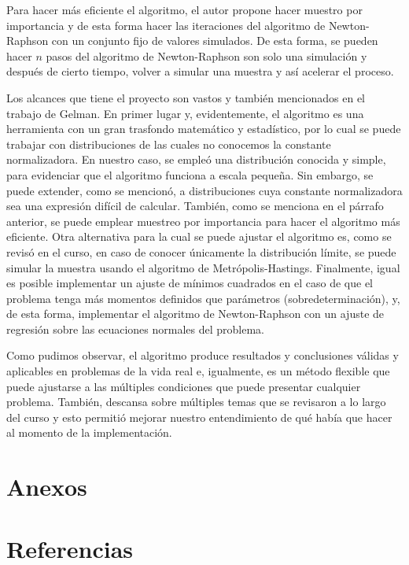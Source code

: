 \documentclass[9pt,twocolumn,twoside,]{pnas-new}
\begin{document}
Para hacer más eficiente el algoritmo, el autor propone hacer muestro
por importancia y de esta forma hacer las iteraciones del algoritmo de
Newton-Raphson con un conjunto fijo de valores simulados. De esta forma,
se pueden hacer \(n\) pasos del algoritmo de Newton-Raphson son solo una
simulación y después de cierto tiempo, volver a simular una muestra y
así acelerar el proceso.

Los alcances que tiene el proyecto son vastos y también mencionados en
el trabajo de Gelman. En primer lugar y, evidentemente, el algoritmo es
una herramienta con un gran trasfondo matemático y estadístico, por lo
cual se puede trabajar con distribuciones de las cuales no conocemos la
constante normalizadora. En nuestro caso, se empleó una distribución
conocida y simple, para evidenciar que el algoritmo funciona a escala
pequeña. Sin embargo, se puede extender, como se mencionó, a
distribuciones cuya constante normalizadora sea una expresión difícil de
calcular. También, como se menciona en el párrafo anterior, se puede
emplear muestreo por importancia para hacer el algoritmo más eficiente.
Otra alternativa para la cual se puede ajustar el algoritmo es, como se
revisó en el curso, en caso de conocer únicamente la distribución
límite, se puede simular la muestra usando el algoritmo de
Metrópolis-Hastings. Finalmente, igual es posible implementar un ajuste
de mínimos cuadrados en el caso de que el problema tenga más momentos
definidos que parámetros (sobredeterminación), y, de esta forma,
implementar el algoritmo de Newton-Raphson con un ajuste de regresión
sobre las ecuaciones normales del problema.

Como pudimos observar, el algoritmo produce resultados y conclusiones
válidas y aplicables en problemas de la vida real e, igualmente, es un
método flexible que puede ajustarse a las múltiples condiciones que
puede presentar cualquier problema. También, descansa sobre múltiples
temas que se revisaron a lo largo del curso y esto permitió mejorar
nuestro entendimiento de qué había que hacer al momento de la
implementación.

\hypertarget{anexos}{%
\section*{Anexos}\label{anexos}}

\hypertarget{referencias}{%
\section*{Referencias}\label{referencias}}
\end{document}
